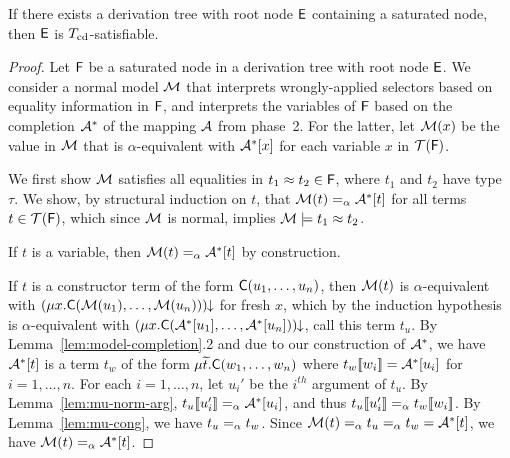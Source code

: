 \begin{lemma}%
\label{lem:ss}%
\afterDot
If there exists a derivation tree with root node $\mathsf{E}$ containing a saturated node, then $\mathsf{E}$ is $T_{\mathrm{cd}}$-satisfiable.
\end{lemma}
\begin{proof}
Let $\mathsf{F}$ be a saturated node in a derivation tree with root node $\mathsf{E}$.
We consider a normal model $\mathcal{M}$
that interprets wrongly-applied selectors based on equality information in $\mathsf{F}$,
and interprets the variables of $\mathsf{F}$ based on the completion $\mathcal{A}^\ast$ of the mapping $\mathcal{A}$ from phase~2.
For the latter, let $\mathcal{M}( x )$ be the value in $\mathcal{M}$ that is $\alpha$-equivalent with $\mathcal{A}^\ast [x]$ for each variable $x$ in $\mathcal{T}(\mathsf{F})$.

We first show $\mathcal{M}$ satisfies all equalities in $t_1 \approx t_2 \in \mathsf{F}$, where $t_1$ and $t_2$ have type $\tau$.
We show,
by structural induction on $t$,
that $\mathcal{M}( t ) \mathrel{=_\alpha} \mathcal{A}^\ast [t]$ for all terms $t \in \mathcal{T}( \mathsf{F} )$,
which since $\mathcal{M}$ is normal, implies $\mathcal{M} \models t_1 \approx t_2$.

If $t$ is a variable, then $\mathcal{M}( t ) \mathrel{=_\alpha} \mathcal{A}^\ast [ t ]$ by construction.

If $t$ is a constructor term of the form $\textsf{C}( u_1, \ldots, u_n )$,
then $\mathcal{M}( t )$ is $\alpha$-equivalent with ${(\mu x. \textsf{C}( \mathcal{M}( u_1 ), \ldots, \mathcal{M}( u_n ) ) )}\!\!\downarrow$ for fresh $x$,
which by the induction hypothesis is $\alpha$-equivalent with ${(\mu x. \textsf{C}( \mathcal{A}^\ast [ u_1 ], \ldots, \mathcal{A}^\ast [ u_n ] ) )}\!\!\downarrow$, call this term $t_u$.
By Lemma~\ref{lem:model-completion}.2 and due to our construction of $\mathcal{A}^\ast$, we have $\mathcal{A}^\ast [t]$ is a term
$t_w$ of the form $\mu {\widetilde{t}}. \textsf{C}( w_1, \ldots, w_n )$
where $t_w[\![ w_i ]\!] = \mathcal{A}^\ast [u_i]$ for $i = 1, \ldots, n$.
For each $i = 1, \ldots, n$, let $u_i'$ be the $i^{th}$ argument of $t_u$.
By Lemma~\ref{lem:mu-norm-arg}, $t_u[\![ u_i' ]\!] \mathrel{=_\alpha} \mathcal{A}^\ast [u_i]$,
and thus $t_u[\![ u_i' ]\!] \mathrel{=_\alpha} t_w[\![  w_i  ]\!]$. %
By Lemma~\ref{lem:mu-cong}, we have $t_u \mathrel{=_\alpha} t_w$.
Since $\mathcal{M}( t ) \mathrel{=_\alpha} t_u \mathrel{=_\alpha} t_w = \mathcal{A}^\ast [t]$,
we have $\mathcal{M}( t ) \mathrel{=_\alpha} \mathcal{A}^\ast [t]$.


\end{proof}
